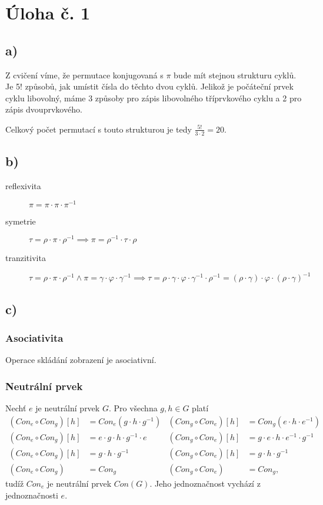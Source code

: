\documentclass{scrartcl}
\begin{document}
    \section*{Úloha č. 1}
    \subsection*{a)}
    Z cvičení víme, že permutace konjugovaná s $\pi$ bude mít stejnou strukturu cyklů. Je 5! způsobů, jak umístit čísla do těchto dvou cyklů. Jelikož je počáteční prvek cyklu libovolný, máme 3 způsoby pro zápis libovolného tříprvkového cyklu a 2 pro zápis dvouprvkového.

    Celkový počet permutací s touto strukturou je tedy $\frac{5!}{3\cdot 2} = 20$.
    \subsection*{b)}
    \begin{description}
        \item[reflexivita] $\pi = \pi \cdot \pi \cdot \pi^{-1}$
        \item[symetrie] $\tau = \rho \cdot \pi \cdot \rho^{-1} \implies \pi = \rho^{-1} \cdot \tau \cdot \rho$ 
        \item[tranzitivita] $\tau = \rho \cdot \pi \cdot \rho^{-1}  \land \pi = \gamma \cdot \varphi \cdot \gamma^{-1} \implies \tau = \rho \cdot \gamma \cdot \varphi \cdot \gamma^{-1} \cdot \rho^{-1} = (\rho \cdot \gamma) \cdot \varphi \cdot (\rho \cdot \gamma)^{-1}$  
    \end{description}

    \subsection*{c)}
    \subsubsection*{Asociativita}
    Operace skládání zobrazení je asociativní.
    \subsubsection*{Neutrální prvek}
    Nechť $e$ je neutrální prvek $G$. Pro všechna $g,h \in G$ platí
    \begin{align*}
        (Con_e \circ Con_g)[h] &= Con_e(g\cdot h \cdot g^{-1}) & (Con_g \circ Con_e)[h] &= Con_g(e \cdot h \cdot e^{-1}) \\
        (Con_e \circ Con_g)[h] &= e \cdot g \cdot h \cdot g^{-1} \cdot e & (Con_g \circ Con_e)[h] &= g \cdot e \cdot h \cdot e^{-1} \cdot g^{-1} \\
        (Con_e \circ Con_g)[h] &= g \cdot h \cdot g^{-1} & (Con_g \circ Con_e)[h] &= g \cdot h \cdot g^{-1} \\
        (Con_e \circ Con_g) &= Con_g & (Con_g \circ Con_e) &= Con_g,
    \end{align*}
    tudíž $Con_e$ je neutrální prvek $Con(G)$. Jeho jednoznačnost vychází z jednoznačnosti $e$.
\end{document}
